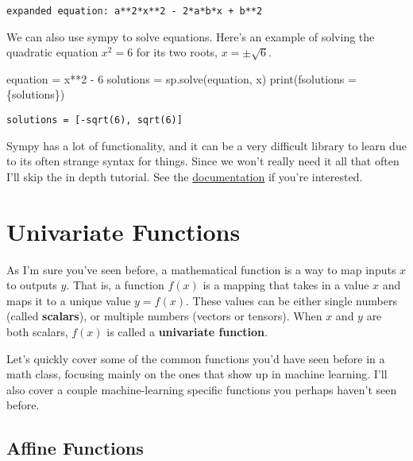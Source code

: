 \documentclass[
  letterpaper,
  DIV=11,
  numbers=noendperiod]{scrreprt}
\newenvironment{Shaded}{\begin{snugshade}}{\end{snugshade}}
\newcommand{\BuiltInTok}[1]{\textcolor[rgb]{0.00,0.23,0.31}{#1}}
\newcommand{\DecValTok}[1]{\textcolor[rgb]{0.68,0.00,0.00}{#1}}
\newcommand{\NormalTok}[1]{\textcolor[rgb]{0.00,0.23,0.31}{#1}}
\newcommand{\OperatorTok}[1]{\textcolor[rgb]{0.37,0.37,0.37}{#1}}
\newcommand{\SpecialCharTok}[1]{\textcolor[rgb]{0.37,0.37,0.37}{#1}}
\newcommand{\SpecialStringTok}[1]{\textcolor[rgb]{0.13,0.47,0.30}{#1}}
\begin{document}
\begin{verbatim}
expanded equation: a**2*x**2 - 2*a*b*x + b**2
\end{verbatim}

We can also use sympy to solve equations. Here's an example of solving
the quadratic equation \(x^2 = 6\) for its two roots,
\(x = \pm \sqrt{6}\).

\begin{Shaded}
\begin{Highlighting}[]
\NormalTok{equation }\OperatorTok{=}\NormalTok{ x}\OperatorTok{**}\DecValTok{2} \OperatorTok{{-}} \DecValTok{6}
\NormalTok{solutions }\OperatorTok{=}\NormalTok{ sp.solve(equation, x)}
\BuiltInTok{print}\NormalTok{(}\SpecialStringTok{f\textquotesingle{}solutions = }\SpecialCharTok{\{}\NormalTok{solutions}\SpecialCharTok{\}}\SpecialStringTok{\textquotesingle{}}\NormalTok{)}
\end{Highlighting}
\end{Shaded}

\begin{verbatim}
solutions = [-sqrt(6), sqrt(6)]
\end{verbatim}

Sympy has a lot of functionality, and it can be a very difficult library
to learn due to its often strange syntax for things. Since we won't
really need it all that often I'll skip the in depth tutorial. See the
\href{https://www.sympy.org/en/index.html}{documentation} if you're
interested.

\hypertarget{univariate-functions}{%
\section{Univariate Functions}\label{univariate-functions}}

As I'm sure you've seen before, a mathematical function is a way to map
inputs \(x\) to outputs \(y\). That is, a function \(f(x)\) is a mapping
that takes in a value \(x\) and maps it to a unique value \(y=f(x)\).
These values can be either single numbers (called \textbf{scalars}), or
multiple numbers (vectors or tensors). When \(x\) and \(y\) are both
scalars, \(f(x)\) is called a \textbf{univariate function}.

Let's quickly cover some of the common functions you'd have seen before
in a math class, focusing mainly on the ones that show up in machine
learning. I'll also cover a couple machine-learning specific functions
you perhaps haven't seen before.

\hypertarget{affine-functions}{%
\subsection{Affine Functions}\label{affine-functions}}
\end{document}
